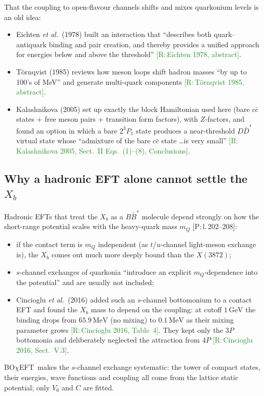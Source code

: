 \documentclass[11pt,a4paper]{article}
\newcommand{\tagP}[1]{\textcolor{blue!65!black}{\textsf{\small[P:\,#1]}}}
\newcommand{\tagR}[1]{\textcolor{ForestGreen}{\textsf{\small[R:\,#1]}}}
\newcommand{\BBst}{B\bar B^*}
\newcommand{\BOchiEFT}{BO$\chi$EFT}
\newcommand{\GeV}{\,\mathrm{GeV}}
\newcommand{\MeV}{\,\mathrm{MeV}}
\begin{document}
That the coupling to open-flavour channels shifts and mixes quarkonium levels is an old idea:
\begin{itemize}
\item Eichten \emph{et al.}\ (1978) built an interaction that ``describes both quark--antiquark binding and pair creation, and thereby provides a unified approach for energies below and above the threshold'' \tagR{Eichten 1978, abstract}.
\item T\"ornqvist (1985) reviews how meson loops shift hadron masses ``by up to 100's of MeV'' and generate multi-quark components \tagR{T\"ornqvist 1985, abstract}.
\item Kalashnikova (2005) set up exactly the block Hamiltonian used here (bare $c\bar c$ states + free meson pairs + transition form factors), with $Z$-factors, and found an option in which a bare $2^3P_1$ state produces a near-threshold $D\bar D^*$ virtual state whose ``admixture of the bare $c\bar c$ state \dots is very small'' \tagR{Kalashnikova 2005, Sect.~II Eqs.~(1)--(8), Conclusions}.
\end{itemize}

\subsection{Why a hadronic EFT alone cannot settle the $X_b$}

Hadronic EFTs that treat the $X_b$ as a $\BBst$ molecule depend strongly on how the short-range potential scales with the heavy-quark mass $m_Q$ \tagP{l.\,202--208}:
\begin{itemize}
\item if the contact term is $m_Q$ independent (as $t$/$u$-channel light-meson exchange is), the $X_b$ comes out much more deeply bound than the $X(3872)$;
\item $s$-channel exchanges of quarkonia ``introduce an explicit $m_Q$-dependence into the potential'' and are usually not included;
\item Cincioglu \emph{et al.}\ (2016) added such an $s$-channel bottomonium to a contact EFT and found the $X_b$ mass to depend on the coupling: at cutoff $1\GeV$ the binding drops from $65.9\MeV$ (no mixing) to $0.1\MeV$ as their mixing parameter grows \tagR{Cincioglu 2016, Table~4}. They kept only the $3P$ bottomonia and deliberately neglected the attraction from $4P$ \tagR{Cincioglu 2016, Sect.~V.3}.
\end{itemize}
\BOchiEFT\ makes the $s$-channel exchange systematic: the tower of compact states, their energies, wave functions and coupling all come from the lattice static potential; only $V_0$ and $C$ are fitted.
\end{document}
